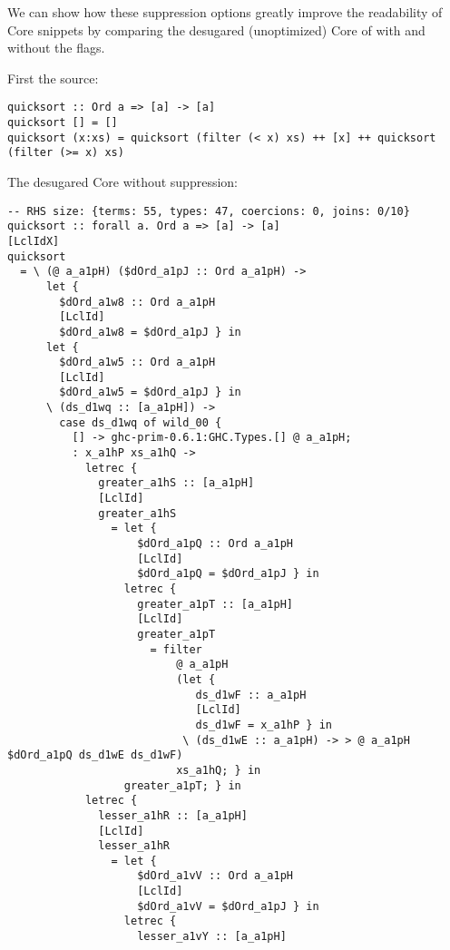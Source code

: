 We can show how these suppression options greatly improve the readability of Core snippets by comparing the
desugared (unoptimized) Core of  with and without the  flags.

First the source:

\begin{listing}[H]
\begin{verbatim}
quicksort :: Ord a => [a] -> [a]
quicksort [] = []
quicksort (x:xs) = quicksort (filter (< x) xs) ++ [x] ++ quicksort (filter (>= x) xs)
\end{verbatim}
\label{code:quicksort_src}
\end{listing}

The desugared Core without suppression:

\begin{listing}[H]
\begin{verbatim}
-- RHS size: {terms: 55, types: 47, coercions: 0, joins: 0/10}
quicksort :: forall a. Ord a => [a] -> [a]
[LclIdX]
quicksort
  = \ (@ a_a1pH) ($dOrd_a1pJ :: Ord a_a1pH) ->
      let {
        $dOrd_a1w8 :: Ord a_a1pH
        [LclId]
        $dOrd_a1w8 = $dOrd_a1pJ } in
      let {
        $dOrd_a1w5 :: Ord a_a1pH
        [LclId]
        $dOrd_a1w5 = $dOrd_a1pJ } in
      \ (ds_d1wq :: [a_a1pH]) ->
        case ds_d1wq of wild_00 {
          [] -> ghc-prim-0.6.1:GHC.Types.[] @ a_a1pH;
          : x_a1hP xs_a1hQ ->
            letrec {
              greater_a1hS :: [a_a1pH]
              [LclId]
              greater_a1hS
                = let {
                    $dOrd_a1pQ :: Ord a_a1pH
                    [LclId]
                    $dOrd_a1pQ = $dOrd_a1pJ } in
                  letrec {
                    greater_a1pT :: [a_a1pH]
                    [LclId]
                    greater_a1pT
                      = filter
                          @ a_a1pH
                          (let {
                             ds_d1wF :: a_a1pH
                             [LclId]
                             ds_d1wF = x_a1hP } in
                           \ (ds_d1wE :: a_a1pH) -> > @ a_a1pH $dOrd_a1pQ ds_d1wE ds_d1wF)
                          xs_a1hQ; } in
                  greater_a1pT; } in
            letrec {
              lesser_a1hR :: [a_a1pH]
              [LclId]
              lesser_a1hR
                = let {
                    $dOrd_a1vV :: Ord a_a1pH
                    [LclId]
                    $dOrd_a1vV = $dOrd_a1pJ } in
                  letrec {
                    lesser_a1vY :: [a_a1pH]

\end{verbatim}
\end{listing}

